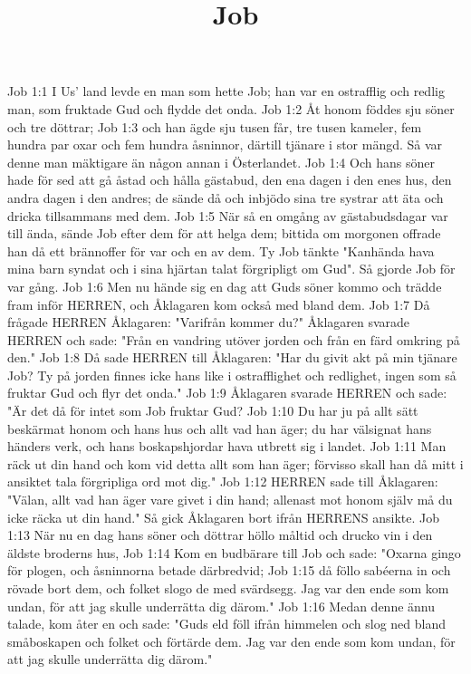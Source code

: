 

\title{Job}

Job 1:1  I Us' land levde en man som hette Job; han var en ostrafflig och redlig man, som fruktade Gud och flydde det onda.
Job 1:2  Åt honom föddes sju söner och tre döttrar;
Job 1:3  och han ägde sju tusen får, tre tusen kameler, fem hundra par oxar och fem hundra åsninnor, därtill tjänare i stor mängd. Så var denne man mäktigare än någon annan i Österlandet.
Job 1:4  Och hans söner hade för sed att gå åstad och hålla gästabud, den ena dagen i den enes hus, den andra dagen i den andres; de sände då och inbjödo sina tre systrar att äta och dricka tillsammans med dem.
Job 1:5  När så en omgång av gästabudsdagar var till ända, sände Job efter dem för att helga dem; bittida om morgonen offrade han då ett brännoffer för var och en av dem. Ty Job tänkte "Kanhända hava mina barn syndat och i sina hjärtan talat förgripligt om Gud". Så gjorde Job för var gång.
Job 1:6  Men nu hände sig en dag att Guds söner kommo och trädde fram inför HERREN, och Åklagaren kom också med bland dem.
Job 1:7  Då frågade HERREN Åklagaren: "Varifrån kommer du?" Åklagaren svarade HERREN och sade: "Från en vandring utöver jorden och från en färd omkring på den."
Job 1:8  Då sade HERREN till Åklagaren: "Har du givit akt på min tjänare Job? Ty på jorden finnes icke hans like i ostrafflighet och redlighet, ingen som så fruktar Gud och flyr det onda."
Job 1:9  Åklagaren svarade HERREN och sade: "Är det då för intet som Job fruktar Gud?
Job 1:10  Du har ju på allt sätt beskärmat honom och hans hus och allt vad han äger; du har välsignat hans händers verk, och hans boskapshjordar hava utbrett sig i landet.
Job 1:11  Man räck ut din hand och kom vid detta allt som han äger; förvisso skall han då mitt i ansiktet tala förgripliga ord mot dig."
Job 1:12  HERREN sade till Åklagaren: "Välan, allt vad han äger vare givet i din hand; allenast mot honom själv må du icke räcka ut din hand." Så gick Åklagaren bort ifrån HERRENS ansikte.
Job 1:13  När nu en dag hans söner och döttrar höllo måltid och drucko vin i den äldste broderns hus,
Job 1:14  Kom en budbärare till Job och sade: "Oxarna gingo för plogen, och åsninnorna betade därbredvid;
Job 1:15  då föllo sabéerna in och rövade bort dem, och folket slogo de med svärdsegg. Jag var den ende som kom undan, för att jag skulle underrätta dig därom."
Job 1:16  Medan denne ännu talade, kom åter en och sade: "Guds eld föll ifrån himmelen och slog ned bland småboskapen och folket och förtärde dem. Jag var den ende som kom undan, för att jag skulle underrätta dig därom."
